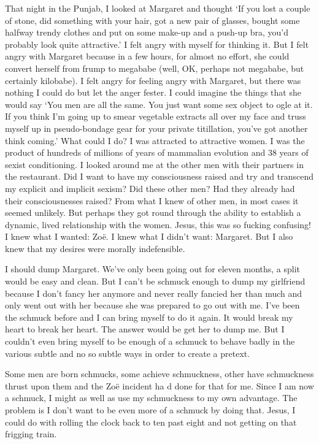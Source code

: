 That night in the Punjab, I looked at Margaret and thought `If you lost a couple of stone, did
something with your hair, got a new pair of glasses, bought some
halfway trendy clothes and put on some make-up and a push-up bra,
you'd probably look quite attractive.' I felt angry with myself for
thinking it. But I felt angry with Margaret because in a few hours,
for almost no effort, she could convert herself from frump to
megababe (well, OK, perhaps not megababe, but certainly kilobabe). I
felt angry for feeling angry with Margaret, but there was nothing I
could do but let the anger fester. I could imagine the things that
she would say `You men are all the same. You just want some sex
object to ogle at it. If you think I'm going up to smear vegetable
extracts all over my face and truss myself up in pseudo-bondage gear
for your private titillation, you've got another think coming.' What
could I do? I was attracted to attractive women. I was the product
of hundreds of millions of years of mammalian evolution and 38 years
of sexist conditioning. I looked around me at the other men with
their partners in the restaurant. Did I want to have my
consciousness raised and try and transcend my explicit and implicit
sexism? Did these other men? Had they already had their
consciousnesses raised? From what I knew of other men, in most cases
it seemed unlikely. But perhaps they got round through the ability
to establish a dynamic, {\twelveit lived\/} relationship with the
women. Jesus, this was so fucking confusing! I knew what I wanted: Zoë. I
knew what I didn't want: Margaret. But I also knew that my desires
were morally indefensible.

I should dump Margaret. We've only been going out for eleven months, a
split would be easy and clean. But I can't be schmuck enough to dump
my girlfriend because I don't fancy her anymore and never really
fancied her than much and only went out with her because she was
prepared to go out with me. I've been the schmuck before and I can
bring myself to do it again. It would break my heart to break her
heart. The answer would be get her to dump me. But I couldn't even
bring myself to be enough of a schmuck to behave badly in the
various subtle and no so subtle ways in order to create a pretext.

Some men are born schmucks, some achieve schmuckness, other have
schmuckness thrust upon them and the Zoë incident ha d done for
that for me. Since I am now a schmuck, I might as well as use my
schmuckness to my own advantage. The problem is I don't want to be
even more of a schmuck by doing that. Jesus, I could do with rolling
the clock back to ten past eight and not getting on that frigging
train.

